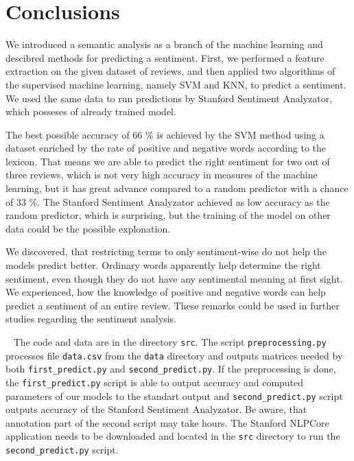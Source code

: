 \documentclass{sig-alternate}
\begin{document}
\section{Conclusions}
We introduced a semantic analysis as a branch of the machine learning and descibred methods for predicting a sentiment. 
First, we performed a feature extraction on the given dataset of reviews, and then applied two algorithms of the supervised machine learning, namely SVM and KNN, to predict a sentiment.
We used the same data to run predictions by Stanford Sentiment Analyzator, which posseses of already trained model.

The best possible accuracy of 66 \% is achieved by the SVM method using a dataset enriched by the rate of positive and negative words according to the lexicon. 
That means we are able to predict the right sentiment for two out of three reviews, which is not very high accuracy in measures of the machine learning, but it has great advance compared to a random predictor with a chance of 33 \%.
The Stanford Sentiment Analyzator achieved as low accuracy as the random predictor, which is surprising, but the training of the model on other data could be the possible explonation.

We discovered, that restricting terms to only sentiment-wise do not help the models predict better.
Ordinary words apparently help determine the right sentiment, even though they do not have any sentimental meaning at first sight.
We experienced, how the knowledge of positive and negative words can help predict a sentiment of an entire review.
These remarks could be used in further studies regarding the sentiment analysis.





%
%
~\newpage
\appendix
The code and data are in the directory {\tt src}.
The script {\tt preprocessing.py} processes file {\tt data.csv} from the {\tt data} directory and outputs matrices needed by both {\tt first\_predict.py} and {\tt second\_predict.py}.
If the preprocessing is done, the {\tt first\_predict.py} script is able to output accuracy and computed parameters of our models to the standart output and {\tt second\_predict.py} script outputs accuracy of the Stanford Sentiment Analyzator.
Be aware, that annotation part of the second script may take hours.
The Stanford NLPCore application needs to be downloaded and located in the {\tt src} directory to run the {\tt second\_predict.py} script.
\end{document}
